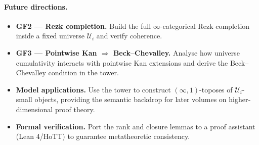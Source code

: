 \documentclass[a4paper,11pt]{article}
\begin{document}
\paragraph{Future directions.}
\begin{itemize}
  \item \textbf{GF2 — Rezk completion.}  
        Build the full \(\infty\)-categorical Rezk completion inside a
        fixed universe \(\mathcal U_{i}\) and verify coherence.
  \item \textbf{GF3 — Pointwise Kan $\Rightarrow$ Beck–Chevalley.}  
        Analyse how universe cumulativity interacts with
        pointwise Kan extensions and derive the Beck–Chevalley
        condition in the tower.
  \item \textbf{Model applications.}  
        Use the tower to construct
        \((\infty,1)\)-toposes of \(\mathcal U_{i}\)-small objects,
        providing the semantic backdrop for later volumes on
        higher‐dimensional proof theory.
  \item \textbf{Formal verification.}  
        Port the rank and closure lemmas to a proof assistant
        (Lean 4/HoTT) to guarantee metatheoretic consistency.
\end{itemize}
\end{document}
